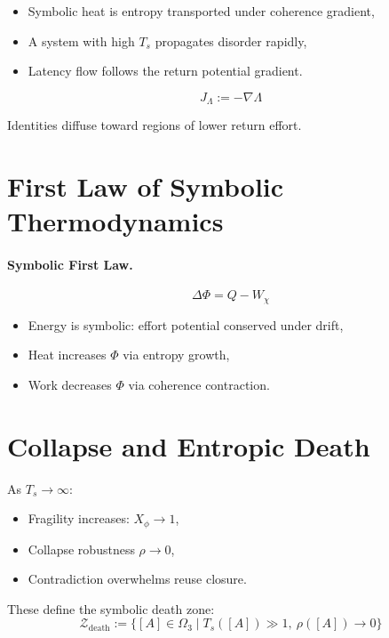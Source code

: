 \begin{itemize}
  \item Symbolic heat is entropy transported under coherence gradient,
  \item A system with high $T_s$ propagates disorder rapidly,
  \item Latency flow follows the return potential gradient.
\end{itemize}

\begin{definition}
\[
J_\Lambda := -\nabla\Lambda
\]
\end{definition}

Identities diffuse toward regions of lower return effort.

\section{First Law of Symbolic Thermodynamics} \label{sec:first-law}

\paragraph{Symbolic First Law.}
\[
\Delta \Phi = Q - W_\chi
\]

\begin{itemize}
  \item Energy is symbolic: effort potential conserved under drift,
  \item Heat increases $\Phi$ via entropy growth,
  \item Work decreases $\Phi$ via coherence contraction.
\end{itemize}

\section{Collapse and Entropic Death} \label{sec:collapse}

As $T_s \to \infty$:
\begin{itemize}
  \item Fragility increases: $X_\phi \to 1$,
  \item Collapse robustness $\rho \to 0$,
  \item Contradiction overwhelms reuse closure.
\end{itemize}

These define the symbolic death zone:
\[
\mathcal{Z}_{\text{death}} := \{ [A] \in \Omega_3 \mid T_s([A]) \gg 1,\ \rho([A]) \to 0 \}
\]

